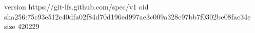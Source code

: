 version https://git-lfs.github.com/spec/v1
oid sha256:75c93e512c40dfa02f84d70d196ed997ae3c009a328c97bb7f0302be08fac34e
size 420229
